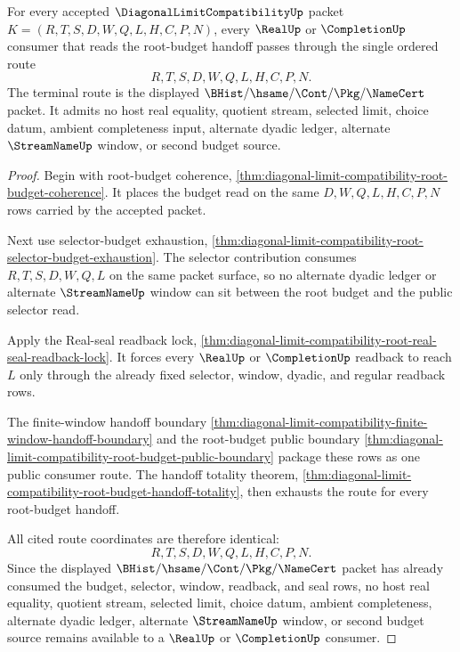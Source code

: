 \begin{theorem}
\label{thm:diagonal-limit-compatibility-budget-coherence-terminal-lock}
For every accepted $\DiagonalLimitCompatibilityUp$ packet
$K=(R,T,S,D,W,Q,L,H,C,P,N)$, every $\RealUp$ or $\CompletionUp$ consumer that
reads the root-budget handoff passes through the single ordered route
$$
R,T,S,D,W,Q,L,H,C,P,N.
$$
The terminal route is the displayed
$\BHist/\hsame/\Cont/\Pkg/\NameCert$ packet. It admits no host real equality,
quotient stream, selected limit, choice datum, ambient completeness input,
alternate dyadic ledger, alternate $\StreamNameUp$ window, or second budget
source.
\end{theorem}
\begin{proof}
Begin with root-budget coherence,
\autoref{thm:diagonal-limit-compatibility-root-budget-coherence}. It places
the budget read on the same $D,W,Q,L,H,C,P,N$ rows carried by the accepted
packet.

Next use selector-budget exhaustion,
\autoref{thm:diagonal-limit-compatibility-root-selector-budget-exhaustion}.
The selector contribution consumes $R,T,S,D,W,Q,L$ on the same packet surface,
so no alternate dyadic ledger or alternate $\StreamNameUp$ window can sit
between the root budget and the public selector read.

Apply the Real-seal readback lock,
\autoref{thm:diagonal-limit-compatibility-root-real-seal-readback-lock}. It
forces every $\RealUp$ or $\CompletionUp$ readback to reach $L$ only through
the already fixed selector, window, dyadic, and regular readback rows.

The finite-window handoff boundary
\autoref{thm:diagonal-limit-compatibility-finite-window-handoff-boundary} and
the root-budget public boundary
\autoref{thm:diagonal-limit-compatibility-root-budget-public-boundary} package
these rows as one public consumer route. The handoff totality theorem,
\autoref{thm:diagonal-limit-compatibility-root-budget-handoff-totality},
then exhausts the route for every root-budget handoff.

All cited route coordinates are therefore identical:
$$
R,T,S,D,W,Q,L,H,C,P,N.
$$
Since the displayed $\BHist/\hsame/\Cont/\Pkg/\NameCert$ packet has already
consumed the budget, selector, window, readback, and seal rows, no host real
equality, quotient stream, selected limit, choice datum, ambient completeness,
alternate dyadic ledger, alternate $\StreamNameUp$ window, or second budget
source remains available to a $\RealUp$ or $\CompletionUp$ consumer.
\end{proof}


